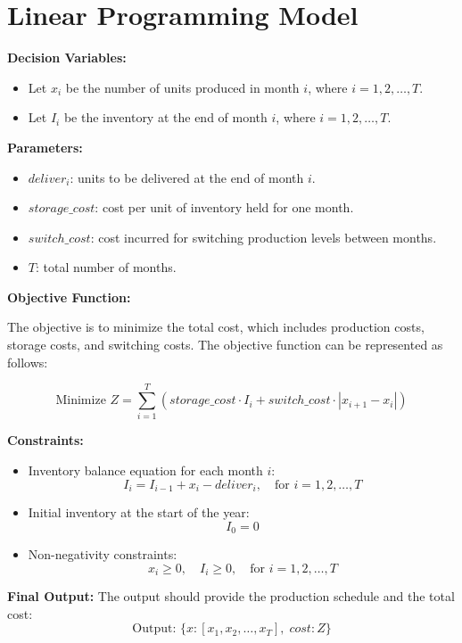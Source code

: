 \documentclass{article}
\begin{document}
\section*{Linear Programming Model}

\textbf{Decision Variables:}
\begin{itemize}
    \item Let $x_i$ be the number of units produced in month $i$, where $i = 1, 2, \ldots, T$.
    \item Let $I_i$ be the inventory at the end of month $i$, where $i = 1, 2, \ldots, T$.
\end{itemize}

\textbf{Parameters:}
\begin{itemize}
    \item $deliver_i$: units to be delivered at the end of month $i$.
    \item $storage\_cost$: cost per unit of inventory held for one month.
    \item $switch\_cost$: cost incurred for switching production levels between months.
    \item $T$: total number of months.
\end{itemize}

\textbf{Objective Function:}

The objective is to minimize the total cost, which includes production costs, storage costs, and switching costs. The objective function can be represented as follows:

\[
\text{Minimize } Z = \sum_{i=1}^{T} (storage\_cost \cdot I_i + switch\_cost \cdot |x_{i+1} - x_i|) 
\]

\textbf{Constraints:}
\begin{itemize}
    \item Inventory balance equation for each month $i$:
        \[
        I_i = I_{i-1} + x_i - deliver_i, \quad \text{for } i = 1, 2, \ldots, T
        \]
    \item Initial inventory at the start of the year:
        \[
        I_0 = 0
        \]
    \item Non-negativity constraints:
        \[
        x_i \geq 0, \quad I_i \geq 0, \quad \text{for } i = 1, 2, \ldots, T
        \]
\end{itemize}

\textbf{Final Output:}
The output should provide the production schedule and the total cost:
\[
\text{Output: } \{ x: [x_1, x_2, \ldots, x_T], \; cost: Z \}
\]
\end{document}
